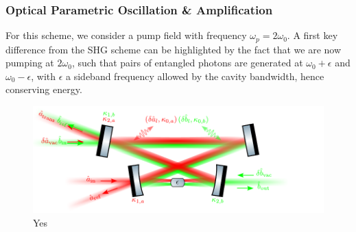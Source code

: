 \subsubsection{Optical Parametric Oscillation \& Amplification}
For this scheme, we consider a pump field with frequency $\omega_p = 2\omega_0$. A first key difference from the SHG scheme can be highlighted by the fact that we are now pumping at $2\omega_0$, such that pairs of entangled photons are generated at $\omega_0 + \epsilon$ and $\omega_0 - \epsilon$, with $\epsilon$ a sideband frequency allowed by the cavity bandwidth, hence conserving energy. 
\begin{figure}[h]
\centering
\includegraphics[width=\textwidth]{./chap2/fig/OPO2.pdf}
\caption{Yes} 
\end{figure}

